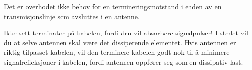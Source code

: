 





Det er overhodet ikke behov for en termineringsmotstand i enden av en transmisjonslinje som avsluttes i en antenne.







Ikke sett terminator på kabelen, fordi den vil absorbere signalpulser! I stedet vil du at selve antennen skal være det dissiperende elementet. Hvis antennen er riktig tilpasset kabelen, vil den terminere kabelen godt nok til å minimere signalrefleksjoner i kabelen, fordi antennen oppfører seg som en dissipativ last.



